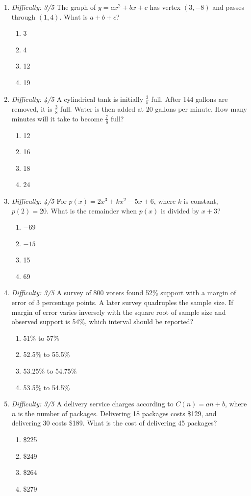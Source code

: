 \documentclass[12pt]{article}
\begin{document}
\begin{enumerate}[leftmargin=*,itemsep=1.2em,topsep=0.8em]
  \item \textit{Difficulty: 3/5} The graph of $y=ax^2+bx+c$ has vertex $(3,-8)$ and passes through $(1,4)$. What is $a+b+c$?
  \begin{enumerate}[label=\Alph*.,itemsep=0pt]
    \item 3 \item 4 \item 12 \item 19
  \end{enumerate}

  \item \textit{Difficulty: 4/5} A cylindrical tank is initially $\tfrac35$ full. After 144 gallons are removed, it is $\tfrac38$ full. Water is then added at 20 gallons per minute. How many minutes will it take to become $\tfrac78$ full?
  \begin{enumerate}[label=\Alph*.,itemsep=0pt]
    \item 12 \item 16 \item 18 \item 24
  \end{enumerate}

  \item \textit{Difficulty: 4/5} For $p(x)=2x^3+kx^2-5x+6$, where $k$ is constant, $p(2)=20$. What is the remainder when $p(x)$ is divided by $x+3$?
  \begin{enumerate}[label=\Alph*.,itemsep=0pt]
    \item $-69$ \item $-15$ \item 15 \item 69
  \end{enumerate}

  \item \textit{Difficulty: 3/5} A survey of 800 voters found 52\% support with a margin of error of 3 percentage points. A later survey quadruples the sample size. If margin of error varies inversely with the square root of sample size and observed support is 54\%, which interval should be reported?
  \begin{enumerate}[label=\Alph*.,itemsep=0pt]
    \item 51\% to 57\% \item 52.5\% to 55.5\%
    \item 53.25\% to 54.75\% \item 53.5\% to 54.5\%
  \end{enumerate}

  \item \textit{Difficulty: 3/5} A delivery service charges according to $C(n)=an+b$, where $n$ is the number of packages. Delivering 18 packages costs \$129, and delivering 30 costs \$189. What is the cost of delivering 45 packages?
  \begin{enumerate}[label=\Alph*.,itemsep=0pt]
    \item \$225 \item \$249 \item \$264 \item \$279
  \end{enumerate}


\end{enumerate}
\end{document}
